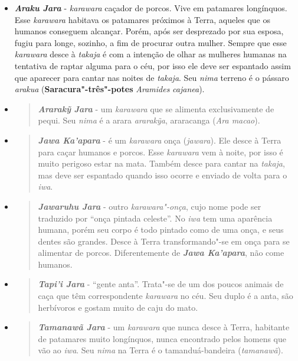 \begin{itemize}
\item
  \emph{\textbf{Araku Jara}} - \emph{karawara} caçador de porcos. Vive
  em patamares longínquos. Esse \emph{karawara} habitava os patamares
  próximos à Terra, aqueles que os humanos conseguem alcançar. Porém,
  após ser desprezado por sua esposa, fugiu para longe, sozinho, a fim
  de procurar outra mulher. Sempre que esse \emph{karawara} desce à
  \emph{takaja} é com a intenção de olhar as mulheres humanas na
  tentativa de raptar alguma para o céu, por isso ele deve ser espantado
  assim que aparecer para cantar nas noites de \emph{takaja}. Seu
  \emph{nima} terreno é o pássaro \emph{arakua}
  (\textbf{Saracura"-três"-potes} \emph{Aramides} \emph{cajanea}).
\item
  \begin{quote}
  \textbf{\emph{Ararakỹ} \emph{Jara}} - um \emph{karawara} que se
  alimenta exclusivamente de pequi. Seu \emph{nima} é a arara
  \emph{ararakỹa}, araracanga (\emph{Ara macao}).
  \end{quote}
\item
  \begin{quote}
  \emph{\textbf{Jawa Ka'apara}} - é um \emph{karawara} onça
  (\emph{jawara}). Ele desce à Terra para caçar humanos e porcos. Esse
  \emph{karawara} vem à noite, por isso é muito perigoso estar na mata.
  Também desce para cantar na \emph{takaja}, mas deve ser espantado
  quando isso ocorre e enviado de volta para o \emph{iwa}.
  \end{quote}
\item
  \begin{quote}
  \emph{\textbf{Jawaruhu Jara}} - outro \emph{karawara"-onça}, cujo nome
  pode ser traduzido por ``onça pintada celeste''. No \emph{iwa} tem uma
  aparência humana, porém seu corpo é todo pintado como de uma onça, e
  seus dentes são grandes. Desce à Terra transformando"-se em onça para
  se alimentar de porcos. Diferentemente de \emph{\textbf{Jawa
  Ka'apara}}, não come humanos.
  \end{quote}
\item
  \begin{quote}
  \emph{\textbf{Tapi'i Jara}} - ``gente anta''. Trata"-se de um dos
  poucos animais de caça que têm correspondente \emph{karawara} no céu.
  Seu duplo é a anta, são herbívoros e gostam muito de caju do mato.
  \end{quote}
\item
  \begin{quote}
  \emph{\textbf{Tamanawã Jara}} - um \emph{karawara} que nunca desce à
  Terra, habitante de patamares muito longínquos, nunca encontrado pelos
  homens que vão ao \emph{iwa}. Seu \emph{nima} na Terra é o
  tamanduá-bandeira (\emph{tamanawã}).
  \end{quote}
\end{itemize}

